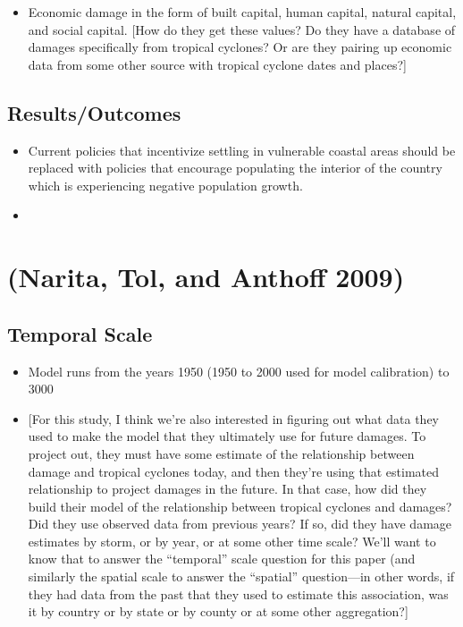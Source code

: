 \documentclass[
]{article}
\providecommand{\tightlist}{%
  \setlength{\itemsep}{0pt}\setlength{\parskip}{0pt}}
\begin{document}
\begin{itemize}
\tightlist
\item
  Economic damage in the form of built capital, human capital, natural
  capital, and social capital. {[}How do they get these values? Do they
  have a database of damages specifically from tropical cyclones? Or are
  they pairing up economic data from some other source with tropical
  cyclone dates and places?{]}
\end{itemize}

\hypertarget{resultsoutcomes-15}{%
\subsection{Results/Outcomes}\label{resultsoutcomes-15}}

\begin{itemize}
\item
  Current policies that incentivize settling in vulnerable coastal areas
  should be replaced with policies that encourage populating the
  interior of the country which is experiencing negative population
  growth.
\item
\end{itemize}

\hypertarget{narita2009damage}{%
\section{(Narita, Tol, and Anthoff 2009)}\label{narita2009damage}}

\hypertarget{temporal-scale-21}{%
\subsection{Temporal Scale}\label{temporal-scale-21}}

\begin{itemize}
\tightlist
\item
  Model runs from the years 1950 (1950 to 2000 used for model
  calibration) to 3000
\item
  {[}For this study, I think we're also interested in figuring out what
  data they used to make the model that they ultimately use for future
  damages. To project out, they must have some estimate of the
  relationship between damage and tropical cyclones today, and then
  they're using that estimated relationship to project damages in the
  future. In that case, how did they build their model of the
  relationship between tropical cyclones and damages? Did they use
  observed data from previous years? If so, did they have damage
  estimates by storm, or by year, or at some other time scale? We'll
  want to know that to answer the ``temporal'' scale question for this
  paper (and similarly the spatial scale to answer the ``spatial''
  question---in other words, if they had data from the past that they
  used to estimate this association, was it by country or by state or by
  county or at some other aggregation?{]}
\end{itemize}
\end{document}
